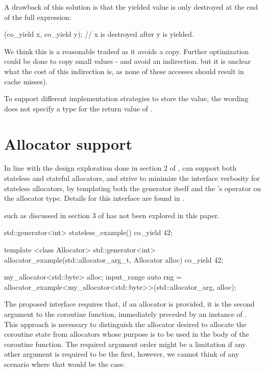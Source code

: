 \documentclass{wg21}
\begin{document}
A drawback of this solution is that the yielded value is only destroyed at the end of the
full expression:
\begin{colorblock}
(co_yield x, co_yield y); // x is destroyed after y is yielded.
\end{colorblock}

We think this is a reasonable tradeof as it avoids a copy.
Further optimization could be done to copy small values - and avoid an indirection.
but it is unclear what the cost of this indirection is, as none of these accesses should result in cache misses).

To support different implementation strategies to store the value, the wording does not specify a type for the return
value of .


\section{Allocator support}

In line with the design exploration done in section 2 of ,  can support both stateless and stateful allocators, and strive
to minimize the interface verbosity for stateless allocators, by templating both the generator itself and the 's  operator
on the allocator type. Details for this interface are found in .

 such as discussed in section 3 of  has not been explored in this paper.

\begin{colorblock}
    std::generator<int> stateless_example() {
        co_yield 42;
    }

    template <class Allocator>
    std::generator<int>
    allocator_example(std::allocator_arg_t, Allocator alloc) {
        co_yield 42;
    }

    my_allocator<std::byte> alloc;
    input_range auto rng = allocator_example<my_allocator<std::byte>>(std::allocator_arg, alloc);

\end{colorblock}

The proposed interface requires that, if an allocator is provided, it is the second argument to the coroutine function,
immediately preceded by an instance of .
This approach is necessary to distinguish the allocator desired to allocate the coroutine state from allocators whose purpose is to be used in the body of the coroutine function.
The required argument order might be a limitation if any other argument is required to be the first, however, we cannot think of any scenario where that would be the case.
\end{document}
